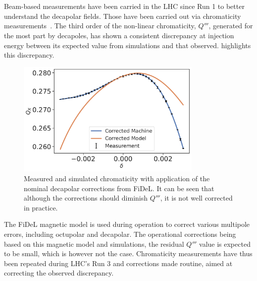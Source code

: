 \section{}


\subsection{}

Beam-based measurements have been carried in the LHC since Run 1 to better understand the decapolar
fields. Those have been carried out via chromaticity
measurements~\cite{maclean_non-linear_2011,maclean_commissioning_2016,maclean_measurement_2014}. 
The third order of the non-linear chromaticity, $Q'''$, generated for the most part by decapoles,
has shown a consistent discrepancy at injection energy between its expected value from simulations
and that observed.  highlights this
discrepancy.

\begin{figure}[!htb]
    \centering
    \includegraphics[width=0.8\textwidth]{images/dq3_corrected_simulation_fidel.pdf}
    \caption{Measured and simulated chromaticity with application of the nominal decapolar
    corrections from FiDeL. It can be seen that although the corrections should diminish $Q'''$, it
    is not well corrected in practice.}
    \label{fig:decapoles:bare_chroma_vs_simulations}
\end{figure}

The FiDeL magnetic model is used during operation to correct various multipole errors, including
octupolar and decapolar. The operational corrections being based on this magnetic model and
simulations, the residual $Q'''$ value is expected to be small, which is however not the case.
Chromaticity measurements have thus been repeated during LHC's Run 3 and corrections made routine,
aimed at correcting the observed discrepancy.

